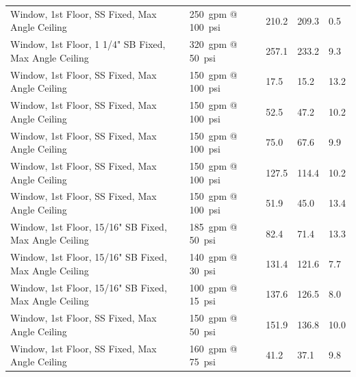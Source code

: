 \documentclass[12pt,oneside]{book}
\begin{document}
\begin{table}[!ht]
\begin{tabular}{lllll}
Window, 1st Floor, SS Fixed, Max Angle Ceiling           & 250~gpm @ 100~psi              & 210.2                             & 209.3                              & 0.5                    \\
Window, 1st Floor, 1 1/4" SB Fixed, Max Angle Ceiling    & 320~gpm @ 50~psi               & 257.1                             & 233.2                              & 9.3                    \\
Window, 1st Floor, SS Fixed, Max Angle Ceiling           & 150~gpm @ 100~psi              & 17.5                              & 15.2                               & 13.2                   \\
Window, 1st Floor, SS Fixed, Max Angle Ceiling           & 150~gpm @ 100~psi              & 52.5                              & 47.2                               & 10.2                   \\
Window, 1st Floor, SS Fixed, Max Angle Ceiling           & 150~gpm @ 100~psi              & 75.0                              & 67.6                               & 9.9                    \\
Window, 1st Floor, SS Fixed, Max Angle Ceiling           & 150~gpm @ 100~psi              & 127.5                             & 114.4                              & 10.2                   \\
Window, 1st Floor, SS Fixed, Max Angle Ceiling           & 150~gpm @ 100~psi              & 51.9                              & 45.0                               & 13.4                   \\
Window, 1st Floor, 15/16" SB Fixed, Max Angle Ceiling    & 185~gpm @ 50~psi               & 82.4                              & 71.4                               & 13.3                   \\
Window, 1st Floor, 15/16" SB Fixed, Max Angle Ceiling    & 140~gpm @ 30~psi               & 131.4                             & 121.6                              & 7.7                    \\
Window, 1st Floor, 15/16" SB Fixed, Max Angle Ceiling    & 100~gpm @ 15~psi               & 137.6                             & 126.5                              & 8.0                    \\
Window, 1st Floor, SS Fixed, Max Angle Ceiling           & 150~gpm @ 50~psi               & 151.9                             & 136.8                              & 10.0                   \\
Window, 1st Floor, SS Fixed, Max Angle Ceiling           & 160~gpm @ 75~psi               &  41.2                             & 37.1                               & 9.8                    \\

\end{tabular}
\end{table}
\end{document}
